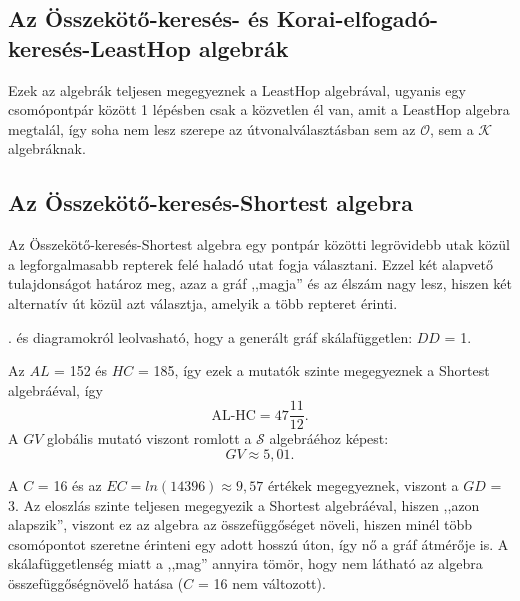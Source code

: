   \subsection{Az Összekötő-keresés- és Korai-elfogadó-keresés-LeastHop algebrák}
  Ezek az algebrák teljesen megegyeznek a LeastHop algebrával, ugyanis egy csomópontpár között 1 lépésben csak a közvetlen él van, amit a LeastHop algebra megtalál, így soha nem lesz szerepe az útvonalválasztásban sem az $\mathcal{O}$, sem a $\mathcal{K}$ algebráknak.

  \subsection{Az Összekötő-keresés-Shortest algebra}
  Az Összekötő-keresés-Shortest algebra egy pontpár közötti legrövidebb utak közül a legforgalmasabb repterek felé haladó utat fogja választani. Ezzel két alapvető tulajdonságot határoz meg, azaz a gráf ,,magja'' és az élszám nagy lesz, hiszen két alternatív út közül azt választja, amelyik a több repteret érinti.\\

  . és  diagramokról leolvasható, hogy a generált gráf skálafüggetlen: $DD$ = 1.

  Az $AL$ = 152 és $HC$ = 185, így ezek a mutatók szinte megegyeznek a Shortest algebráéval, így $$\text{AL-HC}=47\frac{11}{12}.$$ A $GV$ globális mutató viszont romlott a $\mathcal{S}$ algebráéhoz képest: $$GV \approx 5,01.$$

  A $C$ = 16 és az $EC = ln(14396) \approx 9,57$ értékek megegyeznek, viszont a $GD$ = 3. Az eloszlás szinte teljesen megegyezik a Shortest algebráéval, hiszen ,,azon alapszik'', viszont ez az algebra az összefüggőséget növeli, hiszen minél több csomópontot szeretne érinteni egy adott hosszú úton, így nő a gráf átmérője is. A skálafüggetlenség miatt a ,,mag'' annyira tömör, hogy nem látható az algebra összefüggőségnövelő hatása ($C$ = 16 nem változott).


